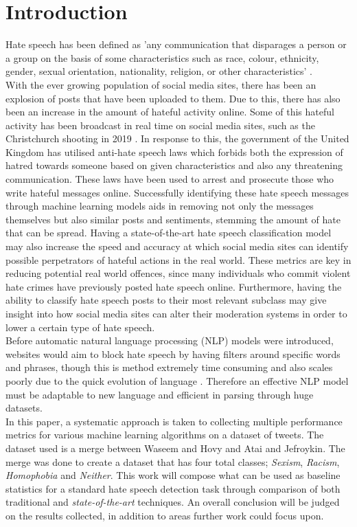 \documentclass[conference]{IEEEtran}
\begin{document}
\section{Introduction}
Hate speech has been defined as 'any communication that disparages a person or a group on the basis of some characteristics such as race, colour, ethnicity, gender, sexual orientation, nationality, religion, or other characteristics' \cite{9}. \\
With the ever growing population of social media sites, there has been an explosion of posts that have been uploaded to them. Due to this, there has also been an increase in the amount of hateful activity online. Some of this hateful activity has been broadcast in real time on social media sites, such as the Christchurch shooting in 2019 \cite{12}. In response to this, the government of the United Kingdom has utilised anti-hate speech laws which forbids both the expression of hatred towards someone based on given characteristics\cite{11} and also any threatening communication\cite{5}. These laws have been used to arrest and prosecute those who write hateful messages online\cite{14}. Successfully identifying these hate speech messages through machine learning models aids in removing not only the messages themselves but also similar posts and sentiments, stemming the amount of hate that can be spread. Having a state-of-the-art hate speech classification model may also increase the speed and accuracy at which social media sites can identify possible perpetrators of hateful actions in the real world. These metrics are key in reducing potential real world offences, since many individuals who commit violent hate crimes have previously posted hate speech online\cite{8}. Furthermore, having the ability to classify hate speech posts to their most relevant subclass may give insight into how social media sites can alter their moderation systems in order to lower a certain type of hate speech.\\
Before automatic natural language processing (NLP) models were introduced, websites would aim to block hate speech by having filters around specific words and phrases, though this is method extremely time consuming and also scales poorly due to the quick evolution of language \cite{13, 2}. Therefore an effective NLP model must be adaptable to new language and efficient in parsing through huge datasets. \\
In this paper, a systematic approach is taken to collecting multiple performance metrics for various machine learning algorithms on a dataset of tweets. The dataset used is a merge between Waseem and Hovy\cite{16} and Atai and Jefroykin\cite{1}. The merge was done to create a dataset that has four total classes; \textit{Sexism}, \textit{Racism}, \textit{Homophobia} and \textit{Neither}.
This work will compose what can be used as baseline statistics for a standard hate speech detection task through comparison of both traditional and \textit{state-of-the-art} techniques. An overall conclusion will be judged on the results collected, in addition to areas further work could focus upon. 
\end{document}
